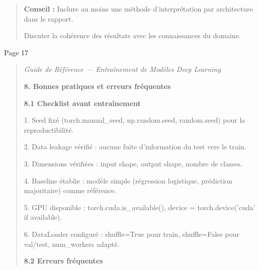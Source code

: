 \documentclass[
]{article}
\begin{document}
\begin{quote}
\textbf{Conseil :} Inclure au moins une méthode d'interprétation par
architecture dans le rapport.

Discuter la cohérence des résultats avec les connaissances du domaine.
\end{quote}

Page 17

\begin{quote}
\emph{Guide de Référence --- Entraînement de Modèles Deep Learning}

\textbf{8. Bonnes pratiques et erreurs fréquentes}

\textbf{8.1 Checklist avant entraînement}

1. Seed fixé (torch.manual\_seed, np.random.seed, random.seed) pour la
reproductibilité.

2. Data leakage vérifié : aucune fuite d'information du test vers le
train.

3. Dimensions vérifiées : input shape, output shape, nombre de classes.

4. Baseline établie : modèle simple (régression logistique, prédiction
majoritaire) comme référence.

5. GPU disponible : torch.cuda.is\_available(), device =
torch.device('cuda' if available).

6. DataLoader configuré : shuffle=True pour train, shuffle=False pour
val/test, num\_workers adapté.

\textbf{8.2 Erreurs fréquentes}
\end{quote}
\end{document}
